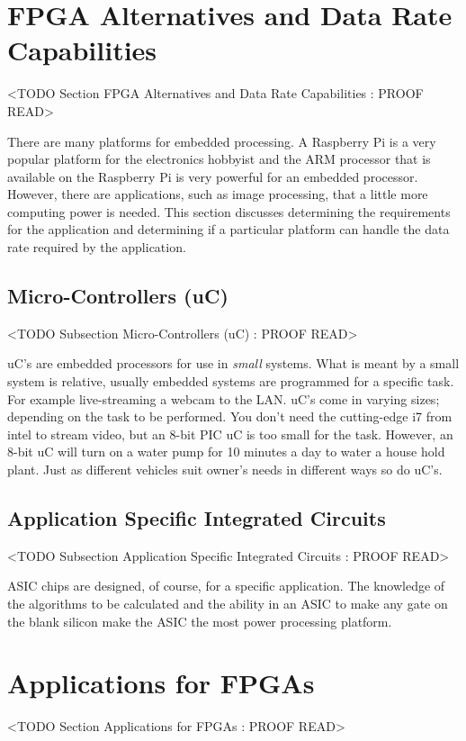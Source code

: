 \section{FPGA Alternatives and Data Rate Capabilities}
	<TODO Section FPGA Alternatives and Data Rate Capabilities : PROOF READ>

There are many platforms for embedded processing. A Raspberry Pi is a very popular platform for the electronics hobbyist and the ARM processor that is available on the Raspberry Pi is very powerful for an embedded processor. However, there are applications, such as image processing, that a little more computing power is needed. This section discusses determining the requirements for the application and determining if a particular platform can handle the data rate required by the application. 

\subsection{Micro-Controllers (uC)}
	<TODO Subsection Micro-Controllers (uC) : PROOF READ>

\ac{uC}'s are embedded processors for use in \emph{small} systems. What is meant by a small system is relative, usually embedded systems are programmed for a specific task. For example live-streaming a webcam to the \ac{LAN}. \ac{uC}'s come in varying sizes; depending on the task to be performed. You don't need the cutting-edge i7 from intel to stream video, but an 8-bit \ac{PIC} \ac{uC} is too small for the task. However, an 8-bit \ac{uC} will turn on a water pump for 10 minutes a day to water a house hold plant. Just as different vehicles suit owner's needs in different ways so do \ac{uC}'s.

\subsection{Application Specific Integrated Circuits}
	<TODO Subsection Application Specific Integrated Circuits : PROOF READ>

\ac{ASIC} chips are designed, of course, for a specific application. The knowledge of the algorithms to be calculated and the ability in an \ac{ASIC} to make any gate on the blank silicon make the \ac{ASIC} the most power processing platform. 

\section{Applications for FPGAs}
	<TODO Section Applications for FPGAs : PROOF READ>

